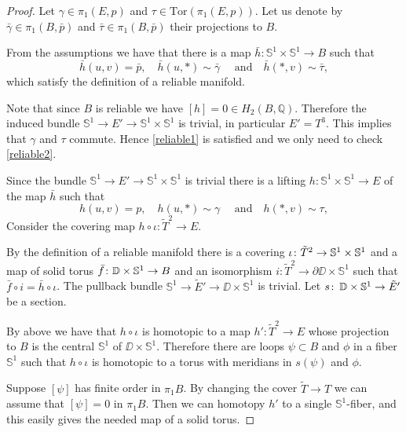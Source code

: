 \documentclass{amsart}
\begin{document}
\begin{proof}
Let $\gamma\in \pi_1(E,p)$ and $\tau\in \mathrm{Tor}(\pi_1(E,p))$. 
Let us denote by $\bar\gamma\in \pi_1(B,\bar p)$ and 
$\bar\tau\in \pi_1(B,\bar p)$ their projections to $B$.

From the assumptions we have 
that there is a map 
$\bar h\colon \mathbb{S}^1\times \mathbb{S}^1\to B$ such that 
$$\bar h(u,v)=\bar p,\quad
\bar h(u,*)\sim\bar\gamma\quad\text{ and}\quad
\bar h(*,v)\sim\bar\tau,$$
which satisfy the definition of a reliable manifold.

Note that since $B$ is reliable we have $[h]=0\in H_2(B,\mathbb{Q})$. Therefore the induced bundle $\mathbb{S}^1\to E'\to \mathbb{S}^1\times \mathbb{S}^1$ is trivial, in particular $E'=T^3$. This  implies that $\gamma$ and $\tau$ commute. Hence \eqref{reliable1} is satisfied and we only need to check \eqref{reliable2}.

Since the bundle  $\mathbb{S}^1\to E'\to \mathbb{S}^1\times \mathbb{S}^1$ is trivial there is a lifting $h\colon \mathbb{S}^1\times \mathbb{S}^1\to E$ of the map $\bar h$ such that
$$ h(u,v)= p,\quad
 h(u,*)\sim\gamma\quad\text{ and}\quad
 h(*,v)\sim\tau,$$
Consider the covering map $h\circ\iota\colon \tilde T^2\to E$.

By the definition of a reliable manifold there is a covering $\iota\colon \tilde T^2\z\to \mathbb{S}^1\times \mathbb{S}^1$ and a map of solid torus $\bar f\colon \DD\times \mathbb{S}^1\z\to B$ and an isomorphism $i\colon \tilde T^2\to \partial \DD\times \mathbb{S}^1$ such that $\bar f\circ i=\bar h\circ\iota$. The pullback bundle $\mathbb{S}^1\to \tilde E'\to \DD\times \mathbb{S}^1$ is trivial. Let $s\colon\thinspace  \mathbb{D}\times \mathbb{S}^1\to  \tilde E'$ be a section.

By above 
we have that $h\circ\iota$ is homotopic to a map
$h'\colon \tilde T^2\to E$ whose projection to $B$ is the central $\mathbb{S}^1$ of 
$\DD\times \mathbb{S}^1$. 
Therefore there are loops $\psi\subset B$ and $\phi$ in a fiber $\mathbb{S}^1$  such that $h\circ\iota$ is homotopic to a torus with meridians in $s(\psi)$ and $\phi$.

Suppose 
$[\psi]$ has finite order in $\pi_1B$. By changing the cover $\tilde T\to T$ we can assume that $[\psi]=0$  in $\pi_1B$.  Then we can homotopy $h'$ to a single $\mathbb{S}^1$-fiber, and this easily gives the needed map of  a solid torus.


\end{proof}
\end{document}
